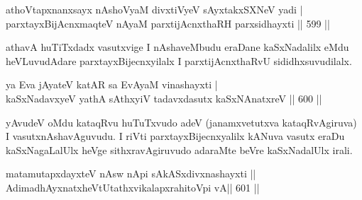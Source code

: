 
\begin{shl}
athoVtapxnanxsayx nAshoV\s yaM divxtiVyeV sAyxtakxSXNeV yadi | \\
parxtayxBijAcnxmaqteV nAyaM parxtijAcnxthaRH parxsidhayxti \hfill||  599 ||  
\end{shl}

\begin{artha}
athavA huTiTxdadx vasutxvige I nAshaveMbudu eraDane kaSxNadalilx eMdu heVLuvudAdare parxtayxBijecnxyilalx I parxtijAcnxthaRvU sididhxsuvudilalx.
\end{artha}


\begin{shl}
ya Eva jAyateV katAR sa EvAyaM vinashayxti | \\
kaSxNadavxyeV yathA sAthxyiV tadavxdasutx kaSxNAnatxreV \hfill||  600 ||  
\end{shl}

\begin{artha}
yAvudeV oMdu kataqRvu huTuTxvudo adeV (janamxvetutxva kataqRvAgiruva) I vasutxnAshavAguvudu. I riVti parxtayxBijecnxyalilx kANuva vasutx eraDu kaSxNagaLalUlx heVge sithxravAgiruvudo adaraMte beVre kaSxNadalUlx irali.
\end{artha}

\begin{shl}
matamutapxdayxteV nAsw nApi sAkASxdivxnashayxti ||  \\
\footnotemark[1]AdimadhAyxnatxheVtUtathxvikalapxrahitoV\s pi vA\footnotemark[2] \hfill||  601 ||  
\end{shl}

